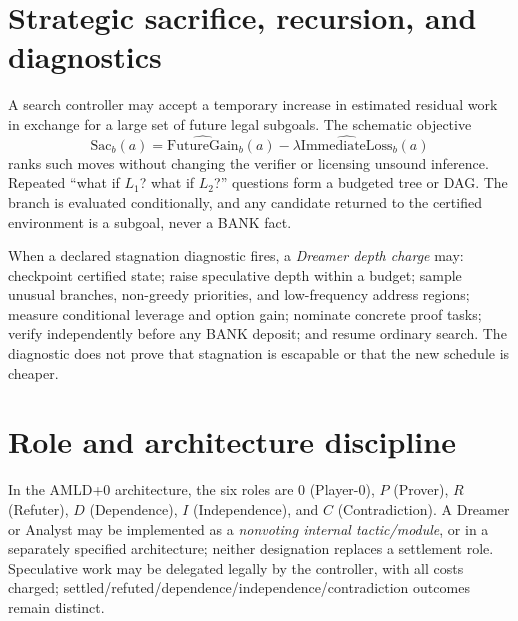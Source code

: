 \section{Strategic sacrifice, recursion, and diagnostics}
A search controller may accept a temporary increase in estimated residual work in exchange for a large set of future legal subgoals. The schematic objective
\[\mathrm{Sac}_b(a)=\widehat{\mathrm{FutureGain}}_b(a)-\lambda\widehat{\mathrm{ImmediateLoss}}_b(a)\]
ranks such moves without changing the verifier or licensing unsound inference. Repeated ``what if $L_1$? what if $L_2$?'' questions form a budgeted tree or DAG. The branch is evaluated conditionally, and any candidate returned to the certified environment is a subgoal, never a BANK fact.

When a declared stagnation diagnostic fires, a \emph{Dreamer depth charge} may: checkpoint certified state; raise speculative depth within a budget; sample unusual branches, non-greedy priorities, and low-frequency address regions; measure conditional leverage and option gain; nominate concrete proof tasks; verify independently before any BANK deposit; and resume ordinary search. The diagnostic does not prove that stagnation is escapable or that the new schedule is cheaper.

\section{Role and architecture discipline}
In the AMLD+0 architecture, the six roles are $0$ (Player-0), $P$ (Prover), $R$ (Refuter), $D$ (Dependence), $I$ (Independence), and $C$ (Contradiction). A Dreamer or Analyst may be implemented as a \emph{nonvoting internal tactic/module}, or in a separately specified architecture; neither designation replaces a settlement role. Speculative work may be delegated legally by the controller, with all costs charged; settled/refuted/dependence/independence/contradiction outcomes remain distinct.

